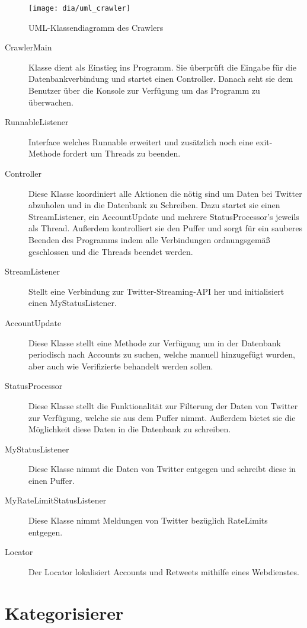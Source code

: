 \begin{figure}[h]
\texttt{[image: dia/uml\_crawler]}
\caption{UML-Klassendiagramm des Crawlers}
\label{fig:uml_crawler}
\end{figure}

\begin{description}
\item[CrawlerMain] Klasse dient als Einstieg ins Programm. Sie überprüft die Eingabe für die Datenbankverbindung und startet einen Controller. Danach seht sie dem Benutzer über die Konsole zur Verfügung um das Programm zu überwachen.
\item[RunnableListener] Interface welches Runnable erweitert und zusätzlich noch eine exit-Methode fordert um Threads zu beenden.
\item[Controller] Diese Klasse koordiniert alle Aktionen die nötig sind um Daten bei Twitter abzuholen und in die Datenbank zu Schreiben. Dazu startet sie einen StreamListener, ein AccountUpdate und mehrere StatusProcessor's jeweils als Thread. Außerdem kontrolliert sie den Puffer und sorgt für ein sauberes Beenden des Programms indem alle Verbindungen ordnungsgemäß geschlossen und die Threads beendet werden.
\item[StreamListener] Stellt eine Verbindung zur Twitter-Streaming-API her und initialisiert einen MyStatusListener.
\item[AccountUpdate] Diese Klasse stellt eine Methode zur Verfügung um in der Datenbank periodisch nach Accounts zu suchen, welche manuell hinzugefügt wurden, aber auch wie Verifizierte behandelt werden sollen.
\item[StatusProcessor] Diese Klasse stellt die Funktionalität zur Filterung der Daten von Twitter zur Verfügung, welche sie aus dem Puffer nimmt. Außerdem bietet sie die Möglichkeit diese Daten in die Datenbank zu schreiben.
\item[MyStatusListener] Diese Klasse nimmt die Daten von Twitter entgegen und schreibt diese in einen Puffer.
\item[MyRateLimitStatusListener] Diese Klasse nimmt Meldungen von Twitter bezüglich RateLimits entgegen.
\item[Locator] Der Locator lokalisiert Accounts und Retweets mithilfe eines Webdienstes.
\end{description}

\section{Kategorisierer}

